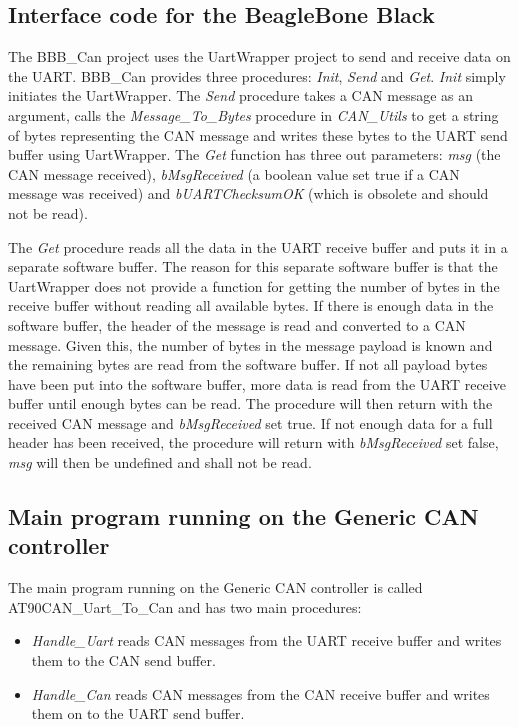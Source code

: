\subsection{Interface code for the BeagleBone Black}
The BBB\_Can project uses the UartWrapper project to send and receive data on the UART. BBB\_Can provides three procedures: \emph{Init}, \emph{Send} and \emph{Get}. \newline
\emph{Init} simply initiates the UartWrapper. \newline
The \emph{Send} procedure takes a CAN message as an argument, calls the \emph{Message\_To\_Bytes} procedure in \emph{CAN\_Utils} to get a string of bytes representing the CAN message and writes these bytes to the UART send buffer using UartWrapper. \newline
The \emph{Get} function has three out parameters: \emph{msg} (the CAN message received), \emph{bMsgReceived} (a boolean value set true if a CAN message was received) and \emph{bUARTChecksumOK} (which is obsolete and should not be read). 

The \emph{Get} procedure reads all the data in the UART receive buffer and puts it in a separate software buffer. The reason for this separate software buffer is that the UartWrapper does not provide a function for getting the number of bytes in the receive buffer without reading all available bytes. \newline
If there is enough data in the software buffer, the header of the message is read and converted to a CAN message. Given this, the number of bytes in the message payload is known and the remaining bytes are read from the software buffer. If not all payload bytes have been put into the software buffer, more data is read from the UART receive buffer until enough bytes can be read. The procedure will then return with the received CAN message and \emph{bMsgReceived} set true. \newline
If not enough data for a full header has been received, the procedure will return with \emph{bMsgReceived} set false, \emph{msg} will then be undefined and shall not be read.


\subsection{Main program running on the Generic CAN controller}
The main program running on the Generic CAN controller is called AT90CAN\_Uart\_To\_Can and has two main procedures:

\begin{itemize}
   \item { \em Handle\_Uart}
   reads CAN messages from the UART receive buffer and writes them to the CAN send buffer.
   \item { \em Handle\_Can}
   reads CAN messages from the CAN receive buffer and writes them on to the UART send buffer.
\end{itemize}

